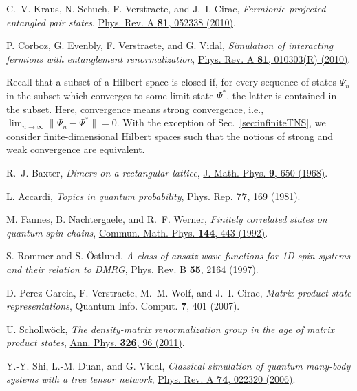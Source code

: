 \documentclass[english,11pt,aps,pra,onecolumn,tightenlines,groupedaddress,superscriptaddress,notitlepage,floatfix,fleqn]{revtex4-1}
\begin{document}
\begin{thebibliography}{10}
C.~V. Kraus, N. Schuch, F. Verstraete, and J.~I. Cirac, {\em Fermionic
  projected entangled pair states},
  \href{https://doi.org/10.1103/PhysRevA.81.052338} {Phys. Rev. A {\bf 81},
  052338  (2010)}.

P. Corboz, G. Evenbly, F. Verstraete, and G. Vidal, {\em Simulation of
  interacting fermions with entanglement renormalization},
  \href{https://doi.org/10.1103/PhysRevA.81.010303} {Phys. Rev. A {\bf 81},
  010303(R)  (2010)}.

Recall that a subset of a Hilbert space is closed if, for every sequence of
  states $\Psi _n$ in the subset which converges to some limit state $\Psi ^*$,
  the latter is contained in the subset. Here, convergence means strong
  convergence, i.e., $\lim _{n\to \infty }\|\Psi _n-\Psi ^*\|=0$. With the
  exception of Sec.~\ref {sec:infiniteTNS}, we consider finite-dimensional
  Hilbert spaces such that the notions of strong and weak convergence are
  equivalent.

R.~J. Baxter, {\em Dimers on a rectangular lattice},
  \href{https://doi.org/10.1063/1.1664623} {J. Math. Phys. {\bf 9},  650
  (1968)}.

L. Accardi, {\em Topics in quantum probability},
  \href{https://doi.org/10.1016/0370-1573(81)90070-3} {Phys. Rep. {\bf 77},
  169  (1981)}.

M. Fannes, B. Nachtergaele, and R.~F. Werner, {\em Finitely correlated states
  on quantum spin chains}, \href{https://doi.org/10.1007/BF02099178} {Commun.
  Math. Phys. {\bf 144},  443  (1992)}.

S. Rommer and S. \"Ostlund, {\em A class of ansatz wave functions for 1D spin
  systems and their relation to DMRG},
  \href{https://doi.org/10.1103/PhysRevB.55.2164} {Phys. Rev. B {\bf 55},  2164
   (1997)}.

D. Perez-Garcia, F. Verstraete, M.~M. Wolf, and J.~I. Cirac, {\em Matrix
  product state representations}, {Quantum Info. Comput. {\bf 7},  401
  (2007)}.

U. Schollw\"{o}ck, {\em The density-matrix renormalization group in the age of
  matrix product states}, \href{https://doi.org/10.1016/j.aop.2010.09.012}
  {Ann. Phys. {\bf 326},  96  (2011)}.

Y.-Y. Shi, L.-M. Duan, and G. Vidal, {\em Classical simulation of quantum
  many-body systems with a tree tensor network},
  \href{https://doi.org/10.1103/PhysRevA.74.022320} {Phys. Rev. A {\bf 74},
  022320  (2006)}.


\end{thebibliography}
\end{document}
